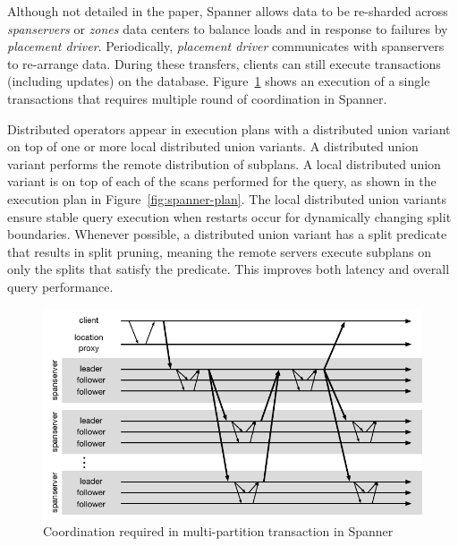 Although not detailed in the paper, Spanner allows data to be re-sharded across
\emph{spanservers} or \emph{zones} data centers to balance loads and in response
to failures by \emph{placement driver}. Periodically, \emph{placement driver}
communicates with spanservers to re-arrange data. During these transfers,
clients can still execute transactions (including updates) on the database.
Figure~\ref{fig:spanner} shows an execution of a single transactions that
requires multiple round of coordination in Spanner.

Distributed operators appear in execution plans with a distributed union variant
on top of one or more local distributed union variants. A distributed union
variant performs the remote distribution of subplans. A local distributed union
variant is on top of each of the scans performed for the query, as shown in the
execution plan in Figure~\ref{fig:spanner-plan}. The local distributed union
variants ensure stable query execution when restarts occur for dynamically
changing split boundaries. Whenever possible, a distributed union variant has a
split predicate that results in split pruning, meaning the remote servers
execute subplans on only the splits that satisfy the predicate. This improves
both latency and overall query performance.


\begin{figure}
  \begin{minipage}[b]{1.0\linewidth}
  \centering
        \includegraphics[width=0.6\linewidth]{figures/spanner-execution}
  \end{minipage}
  \caption{Coordination required in multi-partition transaction in Spanner}
  \label{fig:spanner}
\end{figure}

